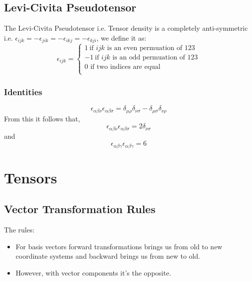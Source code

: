\subsection{Levi-Civita Pseudotensor}
\label{Levi}
The Levi-Civita Pseudotensor i.e. Tensor density is a completely anti-symmetric i.e. $\epsilon_{ijk} = -\epsilon_{jik} = -\epsilon_{ikj} = -\epsilon_{kji}$, we define it as:
\begin{equation}
\epsilon_{ijk} = \begin{cases}
1 \ \text{if } ijk \text{ is an even permuation of } 123\\
-1 \ \text{if } ijk \text{ is an odd permuation of } 123\\
0  \text{ if two indices are equal}\\
\end{cases}
\end{equation}
\subsubsection{Identities}
\begin{equation}
\epsilon_{\alpha \beta \nu}\epsilon_{\alpha \beta \sigma} = \delta_{\mu \rho} \delta_{\nu \sigma} - \delta_{\mu \sigma}\delta_{\nu \rho} 
\end{equation}
From this it follows that,
\begin{equation}
\epsilon_{\alpha \beta \nu}\epsilon_{\alpha \beta \sigma} = 2\delta_{\nu \sigma}
\end{equation}
and
\begin{equation}
\epsilon_{\alpha \beta \gamma}\epsilon_{\alpha \beta \gamma} = 6
\end{equation}
\section{Tensors}
\subsection{Vector Transformation Rules}
The rules:
\begin{itemize}
	\item For basis vectors forward transformations brings us from old to new coordinate systems and backward brings us from new to old.
	\item However, with vector components it's the opposite.\\
\end{itemize}

